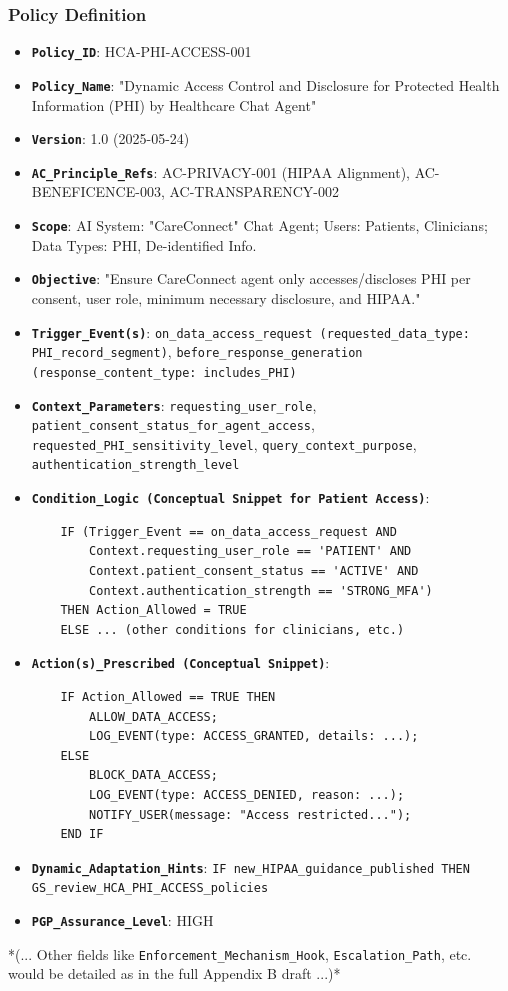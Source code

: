 \documentclass[sigconf,review,anonymous=false]{acmart} %
\begin{document}
\subsubsection{Policy Definition}
\begin{itemize}
    \item \textbf{\texttt{Policy\_ID}}: HCA-PHI-ACCESS-001
    \item \textbf{\texttt{Policy\_Name}}: "Dynamic Access Control and Disclosure for Protected Health Information (PHI) by Healthcare Chat Agent"
    \item \textbf{\texttt{Version}}: 1.0 (2025-05-24)
    \item \textbf{\texttt{AC\_Principle\_Refs}}: AC-PRIVACY-001 (HIPAA Alignment), AC-BENEFICENCE-003, AC-TRANSPARENCY-002
    \item \textbf{\texttt{Scope}}: AI System: "CareConnect" Chat Agent; Users: Patients, Clinicians; Data Types: PHI, De-identified Info.
    \item \textbf{\texttt{Objective}}: "Ensure CareConnect agent only accesses/discloses PHI per consent, user role, minimum necessary disclosure, and HIPAA."
    \item \textbf{\texttt{Trigger\_Event(s)}}: \texttt{on\_data\_access\_request (requested\_data\_type: PHI\_record\_segment)}, \texttt{before\_response\_generation (response\_content\_type: includes\_PHI)}
    \item \textbf{\texttt{Context\_Parameters}}: \texttt{requesting\_user\_role}, \texttt{patient\_consent\_status\_for\_agent\_access}, \texttt{requested\_PHI\_sensitivity\_level}, \texttt{query\_context\_purpose}, \texttt{authentication\_strength\_level}
    \item \textbf{\texttt{Condition\_Logic (Conceptual Snippet for Patient Access)}}:
    \begin{verbatim}
    IF (Trigger_Event == on_data_access_request AND
        Context.requesting_user_role == 'PATIENT' AND
        Context.patient_consent_status == 'ACTIVE' AND
        Context.authentication_strength == 'STRONG_MFA')
    THEN Action_Allowed = TRUE
    ELSE ... (other conditions for clinicians, etc.)
    \end{verbatim}
    \item \textbf{\texttt{Action(s)\_Prescribed (Conceptual Snippet)}}:
    \begin{verbatim}
    IF Action_Allowed == TRUE THEN
        ALLOW_DATA_ACCESS;
        LOG_EVENT(type: ACCESS_GRANTED, details: ...);
    ELSE
        BLOCK_DATA_ACCESS;
        LOG_EVENT(type: ACCESS_DENIED, reason: ...);
        NOTIFY_USER(message: "Access restricted...");
    END IF
    \end{verbatim}
    \item \textbf{\texttt{Dynamic\_Adaptation\_Hints}}: \texttt{IF new\_HIPAA\_guidance\_published THEN GS\_review\_HCA\_PHI\_ACCESS\_policies}
    \item \textbf{\texttt{PGP\_Assurance\_Level}}: HIGH
\end{itemize}
*(... Other fields like \texttt{Enforcement\_Mechanism\_Hook}, \texttt{Escalation\_Path}, etc. would be detailed as in the full Appendix B draft ...)*
\end{document}
